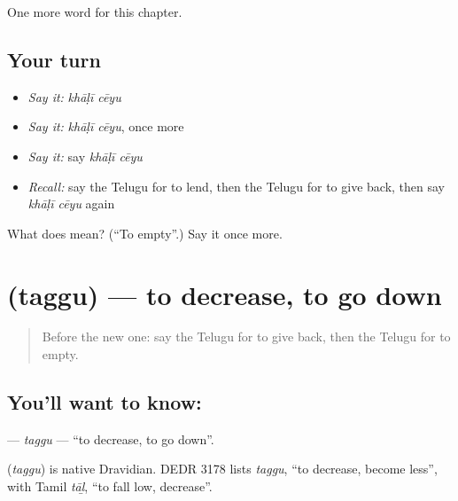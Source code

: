 \begin{grammarlens}[title={What you've built}]
One more word for this chapter.
\end{grammarlens}

\subsection*{Your turn}
\begin{itemize}
\raggedright
  \item \emph{Say it:} \emph{khāḷī cēyu}
  \item \emph{Say it:} \emph{khāḷī cēyu}, once more
  \item \emph{Say it:} say \emph{khāḷī cēyu}
  \item \emph{Recall:} say the Telugu for to lend, then the Telugu for to give back, then say \emph{khāḷī cēyu} again
\end{itemize}

\begin{tcolorbox}[breakable,colback=teal!4,colframe=teal!35!black,title={Before you move on}]
What does   mean? (\textquotedblleft{}To empty\textquotedblright{}.) Say it once more.
\end{tcolorbox}
\section[\texorpdfstring{\te{తగ్గు} (taggu)}{తగ్గు (taggu)}]{ (taggu) — to decrease, to go down}

\label{lesson:TE-C246-taggu}



\begin{quote}
Before the new one: say the Telugu for to give back, then the Telugu for to empty.
\end{quote}

\subsection*{You'll want to know: }
\textbf{} — \emph{taggu} — \textquotedblleft{}to decrease, to go down\textquotedblright{}.

\begin{cousinweb}
\textbf{} (\emph{taggu}) is native Dravidian. DEDR 3178 lists \emph{taggu}, \textquotedblleft{}to decrease, become less\textquotedblright{}, with Tamil \emph{tāḻ}, \textquotedblleft{}to fall low, decrease\textquotedblright{}.
\end{cousinweb}

